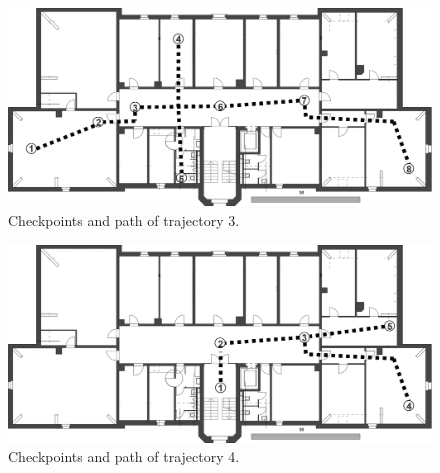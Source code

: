 \begin{figure}[th]
\centering
\includegraphics[width=1.0\textwidth]{Figures/trajectory3}
\decoRule
\caption[Trajectory 3]{Checkpoints and path of trajectory 3.}
\label{fig:trajectory3}
\end{figure}


\begin{figure}[th]
\centering
\includegraphics[width=1.0\textwidth]{Figures/trajectory4}
\decoRule
\caption[Trajectory 4]{Checkpoints and path of trajectory 4.}
\label{fig:trajectory4}
\end{figure}
